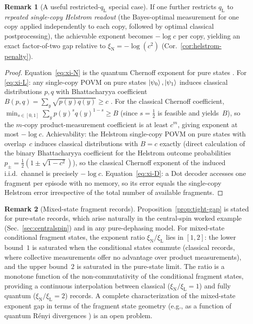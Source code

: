 \documentclass[11pt]{article}
\newcommand{\1}{\mathbf{1}}
\theoremstyle{definition}
\newtheorem{remark}{Remark}
\theoremstyle{plain}
\begin{document}
\begin{remark}[A useful restricted-$q_{\mathrm{L}}$ special case]
If one further restricts $q_{\mathrm{L}}$ to \emph{repeated single-copy Helstrom readout} (the Bayes-optimal measurement for one copy applied independently to each copy, followed by optimal classical postprocessing), the achievable exponent becomes $-\log c$ per copy, yielding an exact factor-of-two gap relative to $\xi_{\mathrm{N}}=-\log(c^2)$ (Cor.~\ref{cor:helstrom-penalty}).
\end{remark}


\begin{proof}
Equation~\eqref{eq:xi-N} is the quantum Chernoff exponent for pure
states \citep{Audenaert2007,NussbaumSzkola2009}.
For \eqref{eq:xi-L}: any single-copy POVM on pure states
$\ket{\psi_0},\ket{\psi_1}$ induces classical distributions $p,q$ with
Bhattacharyya coefficient
$B(p,q)=\sum_y\sqrt{p(y)q(y)}\ge c$
\citep{FuchsCaves1994,Jozsa1994}.
For the classical Chernoff coefficient,
$\min_{s\in[0,1]}\sum_y p(y)^s q(y)^{1-s} \ge B$ (since $s=\tfrac12$
is feasible and yields~$B$), so the $m$-copy product-measurement
coefficient is at least $c^m$, giving exponent at most $-\log c$.
Achievability: the Helstrom single-copy POVM on pure states with
overlap~$c$ induces classical distributions with $B = c$ exactly
(direct calculation of the binary Bhattacharyya coefficient for the
Helstrom outcome probabilities
$p_\pm = \tfrac{1}{2}(1\pm\sqrt{1-c^2})$), so the classical Chernoff
exponent of the induced i.i.d.\ channel is precisely $-\log c$.
Equation~\eqref{eq:xi-D}: a Dot decoder accesses one fragment per
episode with no memory, so its error equals the single-copy Helstrom
error irrespective of the total number of available fragments.
\end{proof}


\begin{remark}[Mixed-state fragment records]
\label{rem:mixed-state-gap}
Proposition~\ref{prop:tight-gap} is stated for pure-state records,
which arise naturally in the central-spin worked example
(Sec.~\ref{sec:centralspin}) and in any pure-dephasing model.
For mixed-state conditional fragment states, the exponent ratio
$\xi_{\mathrm{N}}/\xi_{\mathrm{L}}$ lies in $[1,2]$:
the lower bound~$1$ is saturated when the conditional states commute
(classical records, where collective measurements offer no advantage
over product measurements),
and the upper bound~$2$ is saturated in the pure-state limit.
The ratio is a monotone function of the non-commutativity of the
conditional fragment states, providing a continuous interpolation between
classical ($\xi_{\mathrm{N}}/\xi_{\mathrm{L}}=1$) and fully quantum
($\xi_{\mathrm{N}}/\xi_{\mathrm{L}}=2$) records.
A complete characterization of the mixed-state exponent gap in terms of
the fragment state geometry (e.g., as a function of quantum
R\'{e}nyi divergences \citep{MosonyiOgawa2015}) is an open problem.
\end{remark}
\end{document}
